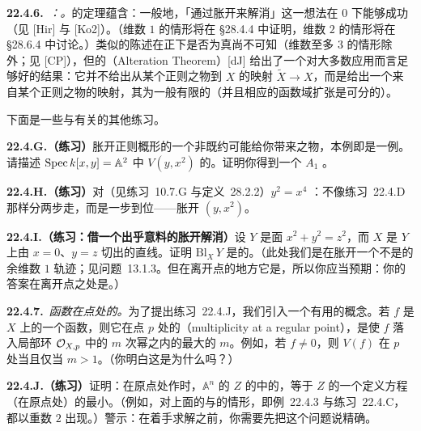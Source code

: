 \textbf{22.4.6.}\ \emph{\trhRemark{}：\trResolutionOfSingularities。}\quad \trHironaka{}的\trResolutionOfSingularities{}定理蕴含：一般地，「通过胀开\trSingularLocus{}来解消\trSingularPoint」这一想法在\trCharacteristic{} $0$ 下能够成功（见 [Hir] 与 [Ko2]）。（维数 $1$ 的情形将在 \S28.4.4 中证明，维数 $2$ 的情形将在 \S28.6.4 中讨论。）类似的陈述在正\trCharacteristic{}下是否为真尚不可知（维数至多 $3$ 的情形除外；见 [CP]），但\trDeJong{}的\textbf{\trAlterationTheorem}（Alteration Theorem）[dJ] 给出了一个对大多数应用而言足够好的结果：它并不给出从某个正则之物到 $X$ 的\trBirational\trProper{}映射 $\widetilde{X}\to X$，而是给出一个来自某个正则之物的\trProper{}映射，其为一般有限的（并且相应的函数域扩张是可分的）。

下面是一些与\trResolutionOfSingularities{}有关的其他练习。

\textbf{22.4.G.（练习）}\quad 胀开正则概形的一个非既约\trSubscheme{}可能给你带来\trSingular{}之物，本例即是一例。请描述 $\operatorname{Spec} k[x,y]=\mathbb{A}^2$ 中\trClosedSubscheme{} $V(y,x^2)$ 的\trBlowup。证明你得到一个 $A_1$ \trSurface\trSingularPoint。

\textbf{22.4.H.（练习）}\quad 对\trTacnode{}（见\mbox{练习~10.7.G} 与\mbox{定义~28.2.2}）$y^2=x^4$ \trDesingularization：不像\mbox{练习~22.4.D} 那样分两步走，而是一步到位——胀开 $(y,x^2)$。

\textbf{22.4.I.（练习：借一个出乎意料的胀开解消\trSingularPoint）}\quad 设 $Y$ 是\trCone{}面 $x^2+y^2=z^2$，而 $X$ 是 $Y$ 上由 $x=0$、$y=z$ 切出的直线。证明 $\mathrm{Bl}_X\,Y$ 是\trRegular{}的。（此处我们是在胀开一个不是\trEffectiveCartierDivisor{}的余维数 $1$ 轨迹；见\mbox{问题~13.1.3}。但在离开\trCone{}点的地方它是\trEffectiveCartierDivisor，所以你应当预期：你的答案在离开\trCone{}点之处是\trIsomorphism。）

\textbf{22.4.7.}\ \emph{函数在\trRegular{}点处的\trMultiplicity。}\quad 为了提出\mbox{练习~22.4.J}，我们引入一个有用的概念。若 $f$ 是\trLocally\trNoetherian{}\trScheme{} $X$ 上的一个函数，则它在\trRegular{}点 $p$ 处的\textbf{\trMultiplicity}（multiplicity at a regular point），是使 $f$ 落入局部环 $\mathcal{O}_{X,p}$ 中\trMaximalIdeal{}的 $m$ 次幂之内的最大的 $m$。例如，若 $f\neq 0$，则 $V(f)$ 在 $p$ 处\trSingular{}当且仅当 $m>1$。（你明白这是为什么吗？）

\textbf{22.4.J.（练习）}\quad 证明：在原点处作\trBlowup{}时，$\mathbb{A}^n$ 的\trSubscheme{} $Z$ 的\trTotalTransform{}中\trExceptionalDivisor{}的\trMultiplicity，等于 $Z$ 的一个定义方程（在原点处）的最小\trMultiplicity。（例如，对上面的\trNode{}\trCurve{}与\trCusp{}\trCurve{}的情形，即\mbox{例~22.4.3} 与\mbox{练习~22.4.C}，\trExceptionalDivisor{}都以重数 $2$ 出现。）警示：在着手求解之前，你需要先把这个问题说精确。

